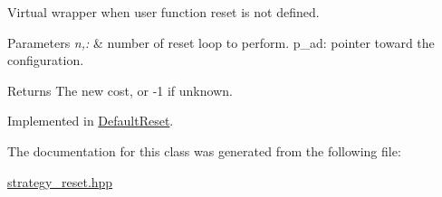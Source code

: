 \-Virtual wrapper when user function reset is not defined. 


\begin{DoxyParams}{\-Parameters}
{\em n,\-:} & number of reset loop to perform. p\-\_\-ad\-: pointer toward the configuration. \\
\hline
\end{DoxyParams}
\begin{DoxyReturn}{\-Returns}
\-The new cost, or -\/1 if unknown. 
\end{DoxyReturn}


\-Implemented in \hyperlink{classDefaultReset_a82e58336172b51b8a8ce0369cbfd0a55}{\-Default\-Reset}.



\-The documentation for this class was generated from the following file\-:\begin{DoxyCompactItemize}
\item 
\hyperlink{strategy__reset_8hpp}{strategy\-\_\-reset.\-hpp}\end{DoxyCompactItemize}

